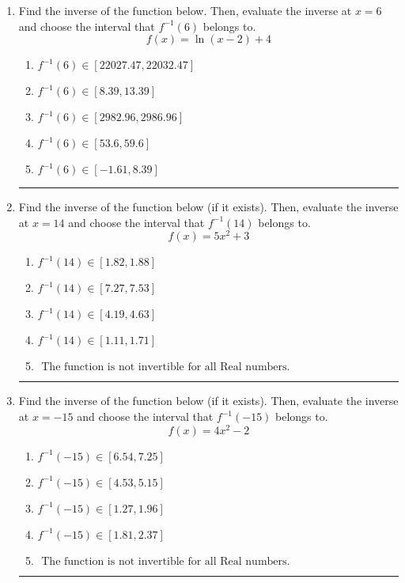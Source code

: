 \documentclass[14pt]{extbook}
\newcommand{\litem}[1]{\item#1\hspace*{-1cm}\rule{\textwidth}{0.4pt}}
\begin{document}
\begin{enumerate}
{\begin{enumerate}[label=\Alph*.]
\end{enumerate} }
\litem{
Find the inverse of the function below. Then, evaluate the inverse at $x = 6$ and choose the interval that $f^{-1}(6)$ belongs to.\[ f(x) = \ln{(x-2)}+4 \]\begin{enumerate}[label=\Alph*.]
\item \( f^{-1}(6) \in [22027.47, 22032.47] \)
\item \( f^{-1}(6) \in [8.39, 13.39] \)
\item \( f^{-1}(6) \in [2982.96, 2986.96] \)
\item \( f^{-1}(6) \in [53.6, 59.6] \)
\item \( f^{-1}(6) \in [-1.61, 8.39] \)

\end{enumerate} }
\litem{
Find the inverse of the function below (if it exists). Then, evaluate the inverse at $x = 14$ and choose the interval that $f^{-1}(14)$ belongs to.\[ f(x) = 5 x^2 + 3 \]\begin{enumerate}[label=\Alph*.]
\item \( f^{-1}(14) \in [1.82, 1.88] \)
\item \( f^{-1}(14) \in [7.27, 7.53] \)
\item \( f^{-1}(14) \in [4.19, 4.63] \)
\item \( f^{-1}(14) \in [1.11, 1.71] \)
\item \( \text{ The function is not invertible for all Real numbers. } \)

\end{enumerate} }
\litem{
Find the inverse of the function below (if it exists). Then, evaluate the inverse at $x = -15$ and choose the interval that $f^{-1}(-15)$ belongs to.\[ f(x) = 4 x^2 - 2 \]\begin{enumerate}[label=\Alph*.]
\item \( f^{-1}(-15) \in [6.54, 7.25] \)
\item \( f^{-1}(-15) \in [4.53, 5.15] \)
\item \( f^{-1}(-15) \in [1.27, 1.96] \)
\item \( f^{-1}(-15) \in [1.81, 2.37] \)
\item \( \text{ The function is not invertible for all Real numbers. } \)


\end{enumerate}}
\end{enumerate}
\end{document}
